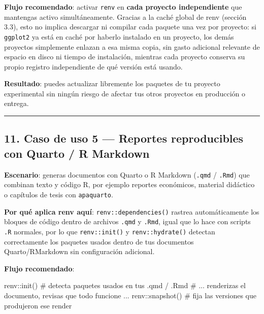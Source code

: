 \documentclass[
  man,
  floatsintext,
  longtable,
  a4paper,
  nolmodern,
  notxfonts,
  notimes,
  12pt,
  colorlinks=true,linkcolor=blue,citecolor=blue,urlcolor=blue]{apa7}
\newenvironment{Shaded}{\begin{snugshade}}{\end{snugshade}}
\newcommand{\CommentTok}[1]{\textcolor[rgb]{0.37,0.37,0.37}{#1}}
\newcommand{\FunctionTok}[1]{\textcolor[rgb]{0.28,0.35,0.67}{#1}}
\newcommand{\NormalTok}[1]{\textcolor[rgb]{0.00,0.23,0.31}{#1}}
\newcommand{\SpecialCharTok}[1]{\textcolor[rgb]{0.37,0.37,0.37}{#1}}
\begin{document}
\textbf{Flujo recomendado}: activar \texttt{renv} en \textbf{cada
proyecto independiente} que mantengas activo simultáneamente. Gracias a
la caché global de renv (sección 3.3), esto no implica descargar ni
compilar cada paquete una vez por proyecto: si \texttt{ggplot2} ya está
en caché por haberlo instalado en un proyecto, los demás proyectos
simplemente enlazan a esa misma copia, sin gasto adicional relevante de
espacio en disco ni tiempo de instalación, mientras cada proyecto
conserva su propio registro independiente de qué versión está usando.

\textbf{Resultado}: puedes actualizar libremente los paquetes de tu
proyecto experimental sin ningún riesgo de afectar tus otros proyectos
en producción o entrega.

\begin{center}\rule{0.5\linewidth}{0.5pt}\end{center}

\subsection{11. Caso de uso 5 --- Reportes reproducibles con Quarto / R
Markdown}\label{caso-de-uso-5-reportes-reproducibles-con-quarto-r-markdown}

\textbf{Escenario}: generas documentos con Quarto o R Markdown
(\texttt{.qmd} / \texttt{.Rmd}) que combinan texto y código R, por
ejemplo reportes económicos, material didáctico o capítulos de tesis con
\texttt{apaquarto}.

\textbf{Por qué aplica renv aquí}: \texttt{renv::dependencies()} rastrea
automáticamente los bloques de código dentro de archivos \texttt{.qmd} y
\texttt{.Rmd}, igual que lo hace con scripts \texttt{.R} normales, por
lo que \texttt{renv::init()} y \texttt{renv::hydrate()} detectan
correctamente los paquetes usados dentro de tus documentos
Quarto/RMarkdown sin configuración adicional.

\textbf{Flujo recomendado}:

\begin{Shaded}
\begin{Highlighting}[]
\NormalTok{renv}\SpecialCharTok{::}\FunctionTok{init}\NormalTok{()      }\CommentTok{\# detecta paquetes usados en tus .qmd / .Rmd}
\CommentTok{\# ... renderizas el documento, revisas que todo funcione ...}
\NormalTok{renv}\SpecialCharTok{::}\FunctionTok{snapshot}\NormalTok{()  }\CommentTok{\# fija las versiones que produjeron ese render}
\end{Highlighting}
\end{Shaded}
\end{document}

